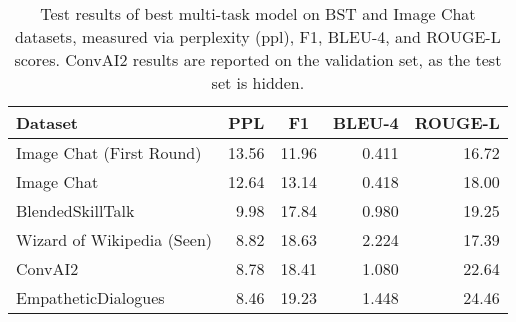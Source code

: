 \documentclass[11pt,a4paper]{article}
\begin{document}
\begin{table*}[t!]
\begin{center}
\small
\begin{tabular}{|l|r|r|r|r|}
 \hline
Dataset & \multicolumn{1}{c}{PPL} & \multicolumn{1}{|c|}{F1} & \multicolumn{1}{|c|}{BLEU-4} & \multicolumn{1}{|c|}{ROUGE-L} \\
\hline
Image Chat (First Round) & 13.56 & 11.96 & 0.411 & 16.72 \\
Image Chat & 12.64 & 13.14 & 0.418 & 18.00 \\
BlendedSkillTalk & 9.98 & 17.84 & 0.980 & 19.25 \\
Wizard of Wikipedia (Seen) & 8.82 & 18.63 & 2.224 & 17.39 \\
ConvAI2 & 8.78 & 18.41 & 1.080 & 22.64 \\
EmpatheticDialogues & 8.46 & 19.23 & 1.448 & 24.46 \\
\hline
\end{tabular}
\caption{Test results of best multi-task model on BST and Image Chat datasets, measured via perplexity (ppl), F1, BLEU-4, and ROUGE-L scores. ConvAI2 results are reported on the validation set, as the test set is hidden.
\label{table:final_auto_results}
}
\end{center}
\end{table*}
\end{document}
